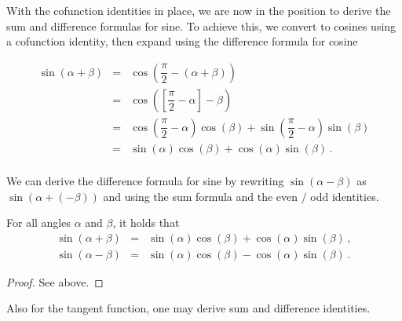 With the cofunction identities in place, we are now in the position to derive the sum and difference formulas for sine.  To achieve this, we convert to cosines using a cofunction identity, then expand using the difference formula for cosine

\[ \begin{array}{rcl}

\sin(\alpha + \beta) & = & \cos\left( \dfrac{\pi}{2} - (\alpha + \beta) \right) \\ [10pt]
                     & = & \cos\left( \left[\dfrac{\pi}{2} - \alpha \right] - \beta \right) \\ [10pt]
                     & = & \cos\left(\dfrac{\pi}{2} - \alpha \right) \cos(\beta) + \sin\left(\dfrac{\pi}{2} - \alpha \right)\sin(\beta) \\ [10pt]
                     & = & \sin(\alpha) \cos(\beta) + \cos(\alpha) \sin(\beta)\,. \\ \end{array} \]


We can derive the difference formula for sine by rewriting  $\sin(\alpha - \beta)$ as $\sin(\alpha + (-\beta))$ and using the sum formula and the even / odd identities. 


\begin{theorem} \label{sinesumdifference} For all angles $\alpha$ and $\beta$, it holds that  
\begin{eqnarray}
\sin(\alpha + \beta) &=& \sin(\alpha) \cos(\beta) + \cos(\alpha) \sin(\beta)\,,\\[0.2cm]
\sin(\alpha - \beta) &=& \sin(\alpha) \cos(\beta) - \cos(\alpha) \sin(\beta)\,.
\end{eqnarray}


\end{theorem}
\ifanalysis
\begin{proof}
See above.
\end{proof}
\fi

Also for the tangent function, one may derive sum and difference identities.

